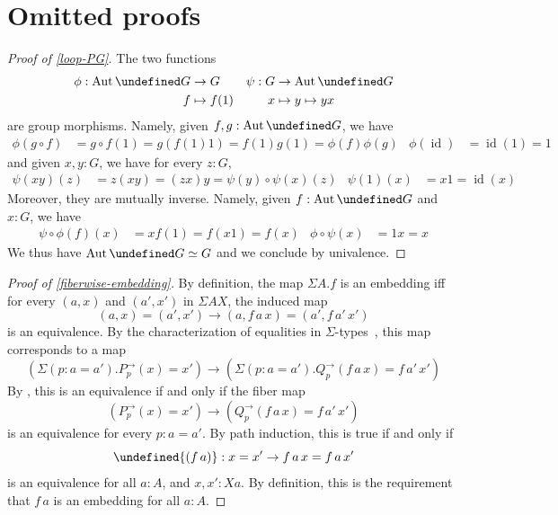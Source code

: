\documentclass[10pt,a4paper]{amsart}
\theoremstyle{definition}
\newcommand{\id}{\operatorname{id}} %
\newcommand{\defd}{:=} %
\newcommand{\subst}[2]{#1^\to_{#2}} %
\newcommand{\Aut}{\operatorname{Aut}} %
\let\P\undefined
\newcommand{\P}[1]{\operatorname{P}_{#1}} %
\let\cong\undefined
\newcommand{\cong}[1]{#1^=} %
\newcommand{\ap}{\cong}
\newcommand{\ie}{i.e.~}
\begin{document}

\appendix
\section{Omitted proofs}
\label{omitted-proofs}
\begin{proof}[Proof of \cref{loop-PG}]
  The two functions
  \begin{align*}
    \phi:\Aut\P G&\to G
    &
    \psi:G&\to\Aut\P G
    \\
    f&\mapsto f(1)
    &
    x&\mapsto y\mapsto yx
  \end{align*}
  are group morphisms. Namely, given $f,g:\Aut\P G$, we have
  \begin{align*}
    \phi(g\circ f)&=g\circ f(1)=g(f(1)1)=f(1)g(1)=\phi(f)\phi(g)
    &
    \phi(\id)&=\id(1)=1
  \end{align*}
  and given $x,y:G$, we have for every $z:G$,
  \begin{align*}
    \psi(xy)(z)&=z(xy)=(zx)y=\psi(y)\circ\psi(x)(z)
    &
    \psi(1)(x)&=x1=\id(x)
  \end{align*}
  Moreover, they are mutually inverse. Namely, given $f:\Aut\P G$ and $x:G$, we
  have
  \begin{align*}
    \psi\circ\phi(f)(x)&=xf(1)=f(x1)=f(x)
    &
    \phi\circ\psi(x)&=1x=x    
  \end{align*}
  We thus have $\Aut\P G\simeq G$ and we conclude by univalence.
\end{proof}

\begin{proof}[Proof of \cref{fiberwise-embedding}]
  By definition, the map $\Sigma A.f$ is an embedding iff for every $(a,x)$ and
  $(a',x')$ in $\Sigma A X$, the induced map
  \[
    (a, x) = (a', x') \to (a, f\,a\,x) = (a', f\,a'\,x')
  \]
  is an equivalence. By the characterization of equalities in
  $\Sigma$-types~\cite[Theorem~2.7.2]{hottbook}, this map corresponds to a map
  \[
    (\Sigma(p : a = a').\subst Pp(x) = x') \to (\Sigma(p : a = a').\subst Qp(f\,a\,x) = f\,a'\,x')
  \]
  By \cite[Theorem~4.7.7]{hottbook}, this is an equivalence if and only if the
  fiber map
  \[
    (\subst Pp(x) = x') \to (\subst Qp(f\,a\,x) = f\,a'\,x')
  \]
  is an equivalence for every $p : a = a'$. By path induction, this is true if
  and only if
  \[
    \ap{(f\,a)} : x = x' \to f\,a\,x = f\,a\,x'
  \]
  is an equivalence for all $a : A$, and $x,x' : X a$. By definition, this is
  the requirement that $f\,a$ is an embedding for all $a : A$.
\end{proof}
\end{document}
